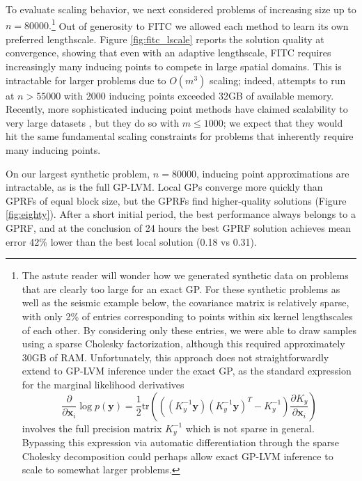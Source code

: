 \documentclass{article}
\newcommand{\tr}{\text{tr}}
\renewcommand{\v}[1]{\mathbf{#1}}
\begin{document}
To evaluate scaling behavior, we next considered problems of
increasing size up to $n=80000.$\footnote{The astute reader will wonder how we generated
  synthetic data on problems that are clearly too large for an exact
  GP. For these synthetic problems as well as the seismic example below, the
  covariance matrix is relatively sparse, with only 2\% of entries
  corresponding to points within six kernel lengthscales of each other. By considering only these
  entries, we were able to draw samples using a sparse Cholesky
  factorization, although this required approximately 30GB of RAM. Unfortunately, this approach does not straightforwardly
  extend to GP-LVM inference under the exact GP, as the standard
  expression for the marginal likelihood
  derivatives \[\frac{\partial}{\partial \v{x}_{i}} \log p(\v{y})
  = \frac{1}{2} \tr\left( \left((K_y^{-1} \v{y}) (K_y^{-1} \v{y})^T -
      K_y^{-1}\right) \frac{\partial K_y}{\partial \v{x}_{i}} \right)\] involves the full
  precision matrix $K_y^{-1}$ which is not sparse in general. Bypassing this expression via 
  automatic differentiation through the sparse Cholesky
  decomposition could perhaps allow exact GP-LVM inference to scale to
  somewhat larger problems.} Out of generosity to FITC we allowed each method to learn
its own preferred lengthscale. Figure \ref{fig:fitc_lscale}
reports the solution quality at convergence, showing that even with an
adaptive lengthscale, FITC requires increasingly many inducing points
to compete in large spatial domains. This is intractable for larger
problems due to $O(m^3)$ scaling; indeed, attempts to run at $n>55000$
with 2000 inducing points exceeded 32GB of available memory. Recently,
more sophisticated inducing point methods have claimed scalability to very large
datasets \cite{hensman2013gaussian, gal2014distributed}, but they do
so with $m\le 1000$; we expect that
they would hit the same fundamental scaling constraints for problems
that inherently require many inducing points. 

On our largest synthetic problem, $n=80000$, inducing point
approximations are intractable, as is the full GP-LVM. Local GPs converge more quickly
than GPRFs of equal block size, but the GPRFs find higher-quality
solutions (Figure \ref{fig:eighty}). After a short initial period, the
best performance always belongs to a GPRF, and at the conclusion of 24 hours the best GPRF
solution achieves mean error 42\% lower than the best local
solution (0.18 vs 0.31).
\vspace{-0.2cm}
\end{document}
